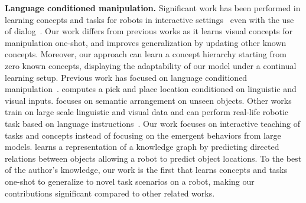 
\textbf{Language conditioned manipulation.} 
Significant work has been performed in  learning concepts and tasks for robots in interactive settings~\cite{gopalan2018sequence,gopalan2020simultaneously,tellex2020robots} even with the use of dialog~\cite{chai2018language,matuszek2012joint}.
Our work differs from previous works as it learns visual concepts for manipulation one-shot, and improves generalization by updating other known concepts.
Moreover, our approach can learn a concept hierarchy starting from zero known concepts, displaying the adaptability of our model under a continual learning setup.
Previous work has focused on language conditioned manipulation~\citep{shridhar2021cliport, liu2021structformer, brohan2023rt1, brohan2023rt2}. \citealt{shridhar2021cliport} computes a pick and place location conditioned on linguistic and visual inputs. 
\citealt{liu2021structformer} focuses on semantic arrangement on unseen objects. 
Other works train on large scale linguistic and visual data and can perform real-life robotic task based on language instructions~\citep{ahn2022i, brohan2023rt1, brohan2023rt2}. Our work focuses on interactive teaching of tasks and concepts instead of focusing on the emergent behaviors from large models. 
\citealt{daruna2019robocse} learns a representation of a knowledge graph by predicting directed relations between objects allowing a robot to predict object locations. 
To the best of the author's knowledge, our work  is the first that learns concepts and tasks one-shot to generalize to novel task scenarios on a robot, making our contributions significant compared to other related works.   


